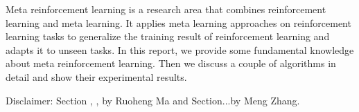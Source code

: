 Meta reinforcement learning is a research area that combines reinforcement learning and meta learning. It applies meta learning approaches on reinforcement learning tasks to generalize the training result of reinforcement learning and adapts it to unseen tasks. In this report, we provide some fundamental knowledge about meta reinforcement learning. Then we discuss a couple of algorithms in detail and show their experimental results.\par
Disclaimer: {\normalfont Section , ,  by Ruoheng Ma and Section...by Meng Zhang.}
